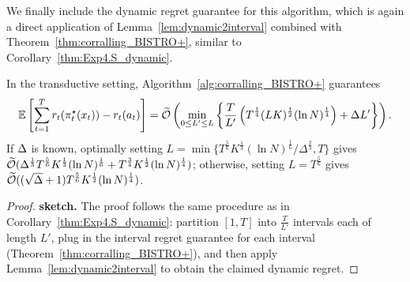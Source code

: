 We finally include the dynamic regret guarantee for this algorithm,
which is again a direct application of Lemma~\ref{lem:dynamic2interval} combined with Theorem~\ref{thm:corralling_BISTRO+},
similar to Corollary~\ref{thm:Exp4.S_dynamic}.

\begin{cor}\label{cor:BISTRO+_dynamic}
In the transductive setting, Algorithm~\ref{alg:corralling_BISTRO+} guarantees
\[
\mathbb{E}\left[ \sum_{t=1}^T r_t(\pi_t^\star(x_t)) - r_t(a_t) \right]  = 
\widetilde{\mathcal{O}}\left( \min_{0\leq L' \leq L}\left\{ \frac{T}{L'}\left( T^{\frac{1}{4}}(LK)^{\frac{1}{2}}(\ln N)^{\frac{1}{4}}\right) + \Delta L' \right\} \right).
\]
If $\Delta$ is known, optimally setting $L=\min\{ T^{\frac{5}{6}}K^{\frac{1}{3}}(\ln N)^{\frac{1}{6}}/\Delta^{\frac{2}{3}},T\}$ gives
$\widetilde{\mathcal{O}}(\Delta^\frac{1}{3}T^\frac{5}{6}K^{\frac{1}{3}}(\ln N)^{\frac{1}{6}} + T^{\frac{3}{4}}K^{\frac{1}{2}}(\ln N)^{\frac{1}{4}})$; otherwise, setting $L = T^\frac{5}{6}$
gives $\widetilde{\mathcal{O}}((\sqrt{\Delta}+1) T^\frac{5}{6}K^\frac{1}{2}(\ln N)^{\frac{1}{4}})$.
\end{cor}

\begin{proof}{\textbf{sketch.}}
The proof follows the same procedure as in Corollary~\ref{thm:Exp4.S_dynamic}: partition $[1,T]$ into $\frac{T}{L'}$ intervals each of length $L'$, plug in the interval regret guarantee for each interval (Theorem~\ref{thm:corralling_BISTRO+}), and then apply Lemma~\ref{lem:dynamic2interval} to obtain the claimed dynamic regret. 
\end{proof}



